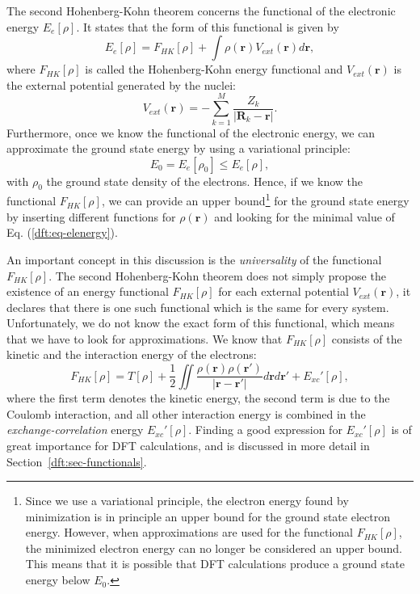 \begin{refsection}
The second Hohenberg-Kohn theorem concerns the functional of the electronic 
energy $E_e[\rho]$. It states that the form of this functional is given by 
\begin{equation}\label{dft:eq-elenergy} 
E_e[\rho] = F_{HK}[\rho] + \int \rho(\mathbf{r}) V_{ext}(\mathbf{r}) 
d\mathbf{r}, 
\end{equation} 
where $F_{HK}[\rho]$ is called the Hohenberg-Kohn energy functional and 
$V_{ext}(\mathbf{r})$ is the external potential generated by the nuclei: 
\begin{equation} 
V_{ext}(\mathbf{r}) =  - \sum_{k=1}^M 
\frac{Z_k}{\left|\mathbf{R}_{k}-\mathbf{r}\right|}. 
\end{equation} 
Furthermore, once we know the functional of the electronic energy, we can 
approximate the ground state energy by using a variational principle: 
\begin{equation} 
E_0 = E_e[\rho_0] \leq E_e[\rho], 
\end{equation} 
with $\rho_0$ the ground state density of the electrons. Hence, if we know the 
functional $F_{HK}[\rho]$, we can provide an upper bound\footnote{Since we use 
a variational principle, the electron energy found by minimization is in 
principle an upper bound for the ground state electron energy. However, when 
approximations are used for the functional $F_{HK}[\rho]$, the minimized 
electron energy can no longer be considered an upper bound. This means that it 
is possible that \gls{DFT} calculations produce a ground state energy below $E_0$.} 
for the ground state energy by inserting different functions for 
$\rho(\mathbf{r})$ and looking for the minimal value of Eq. 
(\ref{dft:eq-elenergy}). 
 
An important concept in this discussion is the \textit{universality} of the functional 
$F_{HK}[\rho]$. The second Hohenberg-Kohn theorem does not simply propose the 
existence of an energy functional $F_{HK}[\rho]$ for each external potential 
$V_{ext}(\mathbf{r})$, it declares that there is one such functional which is 
the same for every system. Unfortunately, we do not know the exact form of 
this functional, which means that we have to look for approximations. We know 
that $F_{HK}[\rho]$ consists of the kinetic and the interaction energy of the 
electrons: 
\begin{equation}\label{dft:eq-HKfunctional} 
F_{HK}[\rho] = T[\rho] + \frac{1}{2} \iint 
\frac{\rho(\mathbf{r})\rho(\mathbf{r'})}{\left| \mathbf{r} - 
\mathbf{r'}\right|} d\mathbf{r} d\mathbf{r'} + E_{xc}'[\rho],  
\end{equation} 
where the first term denotes the kinetic energy, the second term is due to the 
Coulomb interaction, and all other interaction energy is combined in the 
\textit{exchange-correlation} energy $E_{xc}'[\rho]$. Finding a good 
expression for $E_{xc}'[\rho]$ is of great importance for \gls{DFT} calculations, 
and is discussed in more detail in Section~\ref{dft:sec-functionals}. 
 

\end{refsection}
